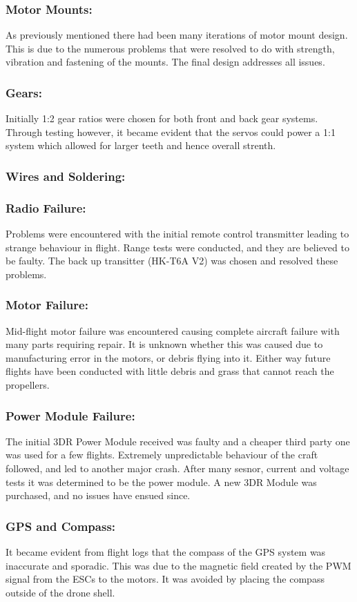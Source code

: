 \subsubsection*{Motor Mounts:} As previously mentioned there had been many iterations of motor mount design. This is due to the numerous problems that were resolved to do with strength, vibration and fastening of the mounts. The final design addresses all issues.
\subsubsection*{Gears:} Initially 1:2 gear ratios were chosen for both front and back gear systems. Through testing however, it became evident that the servos could power a 1:1 system which allowed for larger teeth and hence overall strenth.
\subsubsection*{Wires and Soldering:}  
\subsubsection*{Radio Failure:} Problems were encountered with the initial remote control  transmitter leading to strange behaviour in flight. Range tests were conducted, and they are believed to be faulty. The back up transitter (HK-T6A V2) was chosen and resolved these problems.
\subsubsection*{Motor Failure:} Mid-flight motor failure was encountered causing complete aircraft failure with many parts requiring repair. It is unknown whether this was caused due to manufacturing error in the motors, or debris flying into it. Either way future flights have been conducted with little debris and grass that cannot reach the propellers. 
\subsubsection*{Power Module Failure:}  The initial 3DR Power Module received was faulty and a cheaper third party one was used for a few flights. Extremely unpredictable behaviour of the craft followed, and led to another major crash. After many sesnor, current and voltage tests it was determined to be the power module. A new 3DR Module was purchased, and no issues have ensued since.  
\subsubsection*{GPS and Compass:}  It became evident from flight logs that the compass of the GPS system was inaccurate and sporadic. This was due to the magnetic field created by the PWM signal from the ESCs to the motors. It was avoided by placing the compass outside of the drone shell.\\\\
